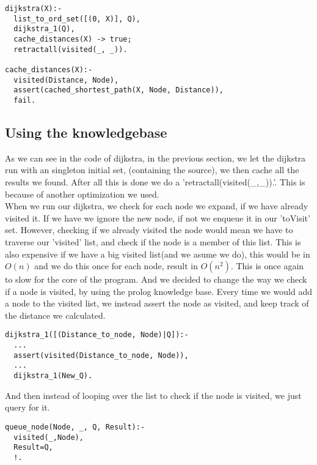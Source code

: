 \begin{lstlisting}
dijkstra(X):-
  list_to_ord_set([(0, X)], Q),
  dijkstra_1(Q),
  cache_distances(X) -> true;
  retractall(visited(_, _)).

cache_distances(X):-
  visited(Distance, Node),
  assert(cached_shortest_path(X, Node, Distance)),
  fail.
\end{lstlisting}

\subsection{Using the knowledgebase}
As we can see in the code of dijkstra, in the previous section, we let the dijkstra run with an singleton initial set, (containing the source), we then cache all the results we found. After all this is done we do a 'retractall(visited(\_,\_)).'. This is because of another optimization we used.\\
When we run our dijkstra, we check for each node we expand, if we have already visited it. If we have we ignore the new node, if not we enqueue it in our 'toVisit' set. However, checking if we already visited the node would mean we have to traverse our 'visited' list, and check if the node is a member of this list. This is also expensive if we have a big visited list(and we asume we do), this would be in $O(n)$ and we do this once for each node, result in $O(n^2)$. This is once again to slow for the core of the program. And we decided to change the way we check if a node is visited, by using the prolog knowledge base. Every time we would add a node to the visited list, we instead assert the node as visited, and keep track of the distance we calculated.
\begin{lstlisting}
dijkstra_1([(Distance_to_node, Node)|Q]):-
  ...
  assert(visited(Distance_to_node, Node)),
  ...
  dijkstra_1(New_Q).
\end{lstlisting}

And then instead of looping over the list to check if the node is visited, we just query for it.
\begin{lstlisting}
queue_node(Node, _, Q, Result):- 
  visited(_,Node), 
  Result=Q, 
  !.
\end{lstlisting}

